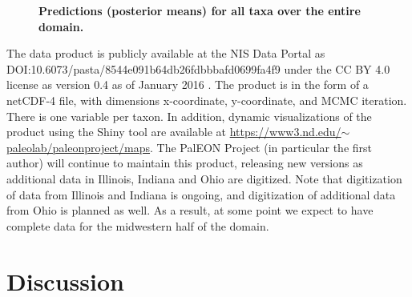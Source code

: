 \documentclass[10pt,letterpaper]{article}
\begin{document}
\begin{figure}

\caption{{\bf Predictions (posterior means) for all taxa over the entire domain.}}
\label{fig:all_predictions}

\end{figure}


The data product is publicly available at the NIS
Data Portal as DOI:10.6073/pasta/8544e091b64db26fdbbbafd0699fa4f9 under
the CC BY 4.0 license as version 0.4 as of January 2016 \cite{paci:etal:data:2016}.
The product is in the form of a netCDF-4 file, with dimensions x-coordinate,
y-coordinate, and MCMC iteration. There is one variable per taxon.
In addition, dynamic visualizations of the product using the Shiny
tool are available at \href{https://www3.nd.edu/~paleolab/paleonproject/maps}{https://www3.nd.edu/$\sim$paleolab/paleonproject/maps}.
The PalEON Project (in particular the first author) will continue
to maintain this product, releasing new versions as additional data
in Illinois, Indiana and Ohio are digitized. Note that digitization
of data from Illinois and Indiana is ongoing, and digitization of
additional data from Ohio is planned as well. As a result, at some
point we expect to have complete data for the midwestern half of the
domain. 


\section*{Discussion}\label{sec:Discussion}
\end{document}
